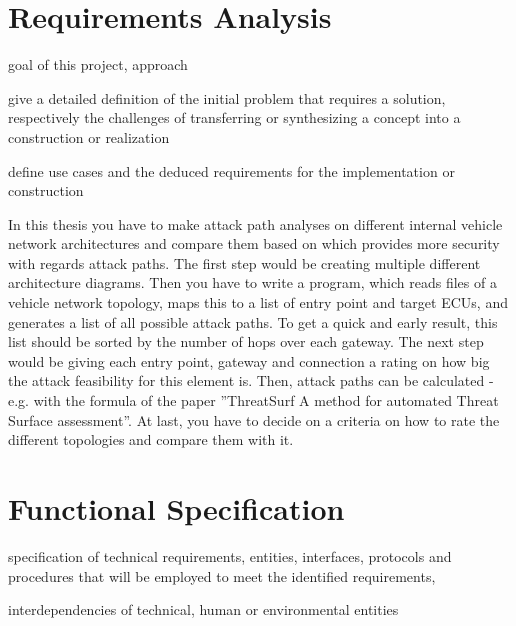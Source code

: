 \chapter{Requirements Analysis}
\label{chp:requirements}


\begin{shaded}
\noindent
goal of this project, approach

\medskip
\noindent
give a detailed definition of the initial problem that requires a solution, 
respectively the challenges of transferring or synthesizing a concept into a construction or realization

\medskip
\noindent
define use cases and the deduced requirements for the implementation or construction
\end{shaded}

In this thesis you have to make attack path analyses on different internal vehicle network architectures and compare them
based on which provides more security with regards attack
paths.
The first step would be creating multiple different architecture diagrams. Then you have to write a program, which reads
files of a vehicle network topology, maps this to a list of entry point and target ECUs, and generates a list of all possible
attack paths. To get a quick and early result, this list should
be sorted by the number of hops over each gateway. The next
step would be giving each entry point, gateway and connection a rating on how big the attack feasibility for this element
is. Then, attack paths can be calculated - e.g. with the formula
of the paper ”ThreatSurf A method for automated Threat Surface assessment”. At last, you have to decide on a criteria on
how to rate the different topologies and compare them with
it.


\chapter{Functional Specification}
\label{chp:specification}


\begin{shaded}
\noindent
specification of technical requirements, entities, interfaces, protocols and procedures that will be employed to meet the identified requirements,

\medskip
\noindent
interdependencies of technical, human or environmental entities
\end{shaded}
